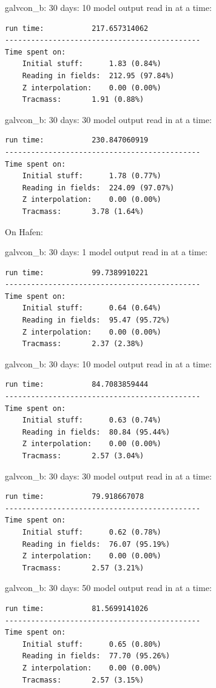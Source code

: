 \documentclass[11pt]{article}
\begin{document}
galvcon_b: 30 days: 10 model output read in at a time: \\
\begin{verbatim}
run time:           217.657314062
---------------------------------------------
Time spent on:
    Initial stuff:      1.83 (0.84%)
    Reading in fields:  212.95 (97.84%)
    Z interpolation:    0.00 (0.00%)
    Tracmass:       1.91 (0.88%)
\end{verbatim}

galvcon_b: 30 days: 30 model output read in at a time: \\
\begin{verbatim}
run time:           230.847060919
---------------------------------------------
Time spent on:
    Initial stuff:      1.78 (0.77%)
    Reading in fields:  224.09 (97.07%)
    Z interpolation:    0.00 (0.00%)
    Tracmass:       3.78 (1.64%)
\end{verbatim}


On Hafen:

galvcon_b: 30 days: 1 model output read in at a time: \\
\begin{verbatim}
run time:           99.7389910221
---------------------------------------------
Time spent on:
    Initial stuff:      0.64 (0.64%)
    Reading in fields:  95.47 (95.72%)
    Z interpolation:    0.00 (0.00%)
    Tracmass:       2.37 (2.38%)
\end{verbatim}

galvcon_b: 30 days: 10 model output read in at a time: \\
\begin{verbatim}
run time:           84.7083859444
---------------------------------------------
Time spent on:
    Initial stuff:      0.63 (0.74%)
    Reading in fields:  80.84 (95.44%)
    Z interpolation:    0.00 (0.00%)
    Tracmass:       2.57 (3.04%)
\end{verbatim}

galvcon_b: 30 days: 30 model output read in at a time: \\
\begin{verbatim}
run time:           79.918667078
---------------------------------------------
Time spent on:
    Initial stuff:      0.62 (0.78%)
    Reading in fields:  76.07 (95.19%)
    Z interpolation:    0.00 (0.00%)
    Tracmass:       2.57 (3.21%)
\end{verbatim}

galvcon_b: 30 days: 50 model output read in at a time: \\
\begin{verbatim}
run time:           81.5699141026
---------------------------------------------
Time spent on:
    Initial stuff:      0.65 (0.80%)
    Reading in fields:  77.70 (95.26%)
    Z interpolation:    0.00 (0.00%)
    Tracmass:       2.57 (3.15%)
\end{verbatim}
\end{document}
